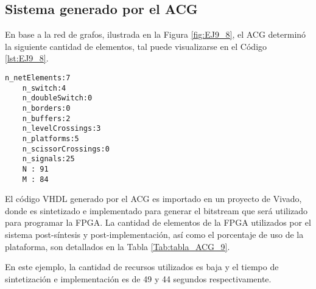 \subsection{Sistema generado por el ACG}

	En base a la red de grafos, ilustrada en la Figura \ref{fig:EJ9_8}, el ACG determinó la siguiente cantidad de elementos, tal puede visualizarse en el Código \ref{lst:EJ9_8}.
	
	\begin{lstlisting}[language = {}, caption = Cantidad de elementos a implementar por el ACG, label = {lst:EJ9_8}]
	n_netElements:7
	n_switch:4
	n_doubleSwitch:0
	n_borders:0
	n_buffers:2
	n_levelCrossings:3
	n_platforms:5
	n_scissorCrossings:0
	n_signals:25
	N : 91
	M : 84
	\end{lstlisting}
	
	El código VHDL generado por el ACG es importado en un proyecto de Vivado, donde es sintetizado e implementado para generar el bitstream que será utilizado para programar la FPGA. La cantidad de elementos de la FPGA utilizados por el sistema post-síntesis y post-implementación, así como el porcentaje de uso de la plataforma, son detallados en la Tabla \ref{Tab:tabla_ACG_9}.
	
	\begin{table}[H]
		{
			\caption{Síntesis e implementación del ejemplo 9 generado por el ACG.}
			\label{Tab:tabla_ACG_9}
			\centering
			\begin{center}
			\end{center}
		}    
	\end{table}
	
	En este ejemplo, la cantidad de recursos utilizados es baja y el tiempo de sintetización e implementación es de 49 y 44 segundos respectivamente.